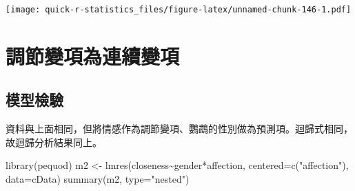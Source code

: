\documentclass[
]{book}
\newenvironment{Shaded}{\begin{snugshade}}{\end{snugshade}}
\newcommand{\AttributeTok}[1]{\textcolor[rgb]{0.77,0.63,0.00}{#1}}
\newcommand{\FunctionTok}[1]{\textcolor[rgb]{0.00,0.00,0.00}{#1}}
\newcommand{\NormalTok}[1]{#1}
\newcommand{\OtherTok}[1]{\textcolor[rgb]{0.56,0.35,0.01}{#1}}
\newcommand{\SpecialCharTok}[1]{\textcolor[rgb]{0.00,0.00,0.00}{#1}}
\newcommand{\StringTok}[1]{\textcolor[rgb]{0.31,0.60,0.02}{#1}}
\begin{document}
\texttt{[image: quick-r-statistics\_files/figure-latex/unnamed-chunk-146-1.pdf]}

\hypertarget{ux8abfux7bc0ux8b8aux9805ux70baux9023ux7e8cux8b8aux9805}{%
\section{調節變項為連續變項}\label{ux8abfux7bc0ux8b8aux9805ux70baux9023ux7e8cux8b8aux9805}}

\hypertarget{ux6a21ux578bux6aa2ux9a57-1}{%
\subsection{模型檢驗}\label{ux6a21ux578bux6aa2ux9a57-1}}

資料與上面相同，但將情感作為調節變項、鸚鵡的性別做為預測項。迴歸式相同，故迴歸分析結果同上。

\begin{Shaded}
\begin{Highlighting}[]
\FunctionTok{library}\NormalTok{(pequod)}
\NormalTok{m2 }\OtherTok{\textless{}{-}} \FunctionTok{lmres}\NormalTok{(closeness}\SpecialCharTok{\textasciitilde{}}\NormalTok{gender}\SpecialCharTok{*}\NormalTok{affection, }\AttributeTok{centered=}\FunctionTok{c}\NormalTok{(}\StringTok{"affection"}\NormalTok{), }\AttributeTok{data=}\NormalTok{cData)}
\FunctionTok{summary}\NormalTok{(m2, }\AttributeTok{type=}\StringTok{"nested"}\NormalTok{)}
\end{Highlighting}
\end{Shaded}
\end{document}
